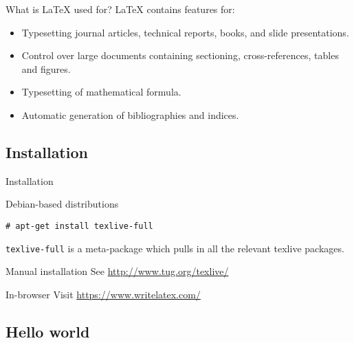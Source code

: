 \documentclass[compress]{beamer}
\newcommand{\pkgname}[1] {{\tt #1}}
\begin{document}
\begin{frame}{What is \LaTeX{} used for?}
    \LaTeX{} contains features for:

    \begin{itemize}
        \item Typesetting journal articles, technical reports, books, and slide 
            presentations.
        \item Control over large documents containing sectioning, 
            cross-references, tables and figures.
        \item Typesetting of mathematical formula.
        \item Automatic generation of bibliographies and indices.
    \end{itemize}

\end{frame}


\subsection{Installation}

\begin{frame}[fragile]{Installation}

    \begin{block}{Debian-based distributions}
\begin{lstlisting}
# apt-get install texlive-full
\end{lstlisting}
        {
            \footnotesize
            \pkgname{texlive-full} is a meta-package which pulls in all the 
            relevant texlive packages.
        }
    \end{block}

    \begin{block}{Manual installation}
        See \href{http://www.tug.org/texlive/}{http://www.tug.org/texlive/}
    \end{block}

    \begin{block}{In-browser}
        Visit \href{https://www.writelatex.com/}{https://www.writelatex.com/}
    \end{block}

\end{frame}

\subsection{Hello world}
\end{document}
